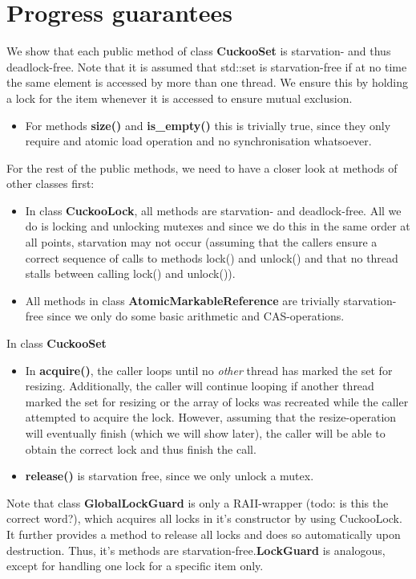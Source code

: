\documentclass[a4paper,10pt]{article}
\begin{document}
\section{Progress guarantees}
\label{sec:progressGuarantees}
We show that each public method of class \textbf{CuckooSet} is starvation- and thus deadlock-free. Note that it is assumed that std::set is starvation-free if at no time the same element is accessed by more than one thread. We ensure this by holding a lock for the item whenever it is accessed to ensure mutual exclusion.
\begin{itemize}
\item For methods \textbf{size()} and \textbf{is\_empty()} this is trivially true, since they only require and atomic load operation and no synchronisation 
whatsoever.
\end{itemize}
For the rest of the public methods, we need to have a closer look at methods of other classes first:
\begin{itemize}
\item In class \textbf{CuckooLock}, all methods are starvation- and deadlock-free. All we do is locking and unlocking mutexes and since we do this in the same order at all points, starvation may not occur (assuming that the callers ensure a correct sequence of calls to methods lock() and unlock() and that no thread stalls between calling lock() and unlock()).
\item All methods in class \textbf{AtomicMarkableReference} are trivially starvation-free since we only do some basic arithmetic and CAS-operations.
\end{itemize}

In class \textbf{CuckooSet}
\begin{itemize}
\item In \textbf{acquire()}, the caller loops until no \textit{other} thread has marked the set for resizing. Additionally, the caller will continue looping if another thread marked the set for resizing or the array of locks was recreated while the caller attempted to acquire the lock. However, assuming that the resize-operation will eventually finish (which we will show later), the caller will be able to obtain the correct lock and thus finish the call.
\item \textbf{release()} is starvation free, since we only unlock a mutex.
\end{itemize}
Note that class \textbf{GlobalLockGuard} is only a RAII-wrapper (todo: is this the correct word?), which acquires all locks in it's constructor by using CuckooLock. It further provides a method to release all locks and does so automatically upon destruction. Thus, it's methods are starvation-free.\textbf{LockGuard} is analogous, except for handling one lock for a specific item only. 
\end{document}
